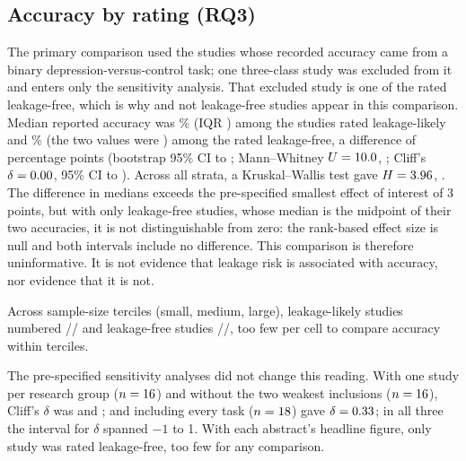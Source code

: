 \subsection{Accuracy by rating (RQ3)}
The primary comparison used the \NaccStudies{} studies whose recorded accuracy came from a binary depression-versus-control task; one three-class study was excluded from it and enters only the sensitivity analysis.
That excluded study is one of the \NFree{} rated leakage-free, which is why \NaccFree{} and not \NFree{} leakage-free studies appear in this comparison. Median reported accuracy was \MedLikely\% (IQR \IQRLikely) among the \NaccLikely{} studies rated leakage-likely and \MedFree\% (the two values were \AccFreeValues) among the \NaccFree{} rated leakage-free, a difference of \MedDiff{} percentage points (bootstrap 95\% CI \MedDiffLo{} to \MedDiffHi; Mann--Whitney $U = 10.0$, \MWp; Cliff's $\delta = 0.00$, 95\% CI \CliffLo{} to \CliffHi). Across all \KWk{} strata, a Kruskal--Wallis test gave $H = 3.96$, \KWp.
The difference in medians exceeds the pre-specified smallest effect of interest of 3 points, but with only \NaccFree{} leakage-free studies, whose median is the midpoint of their two accuracies, it is not distinguishable from zero: the rank-based effect size is null and both intervals include no difference. This comparison is therefore uninformative. It is not evidence that leakage risk is associated with accuracy, nor evidence that it is not.

Across sample-size terciles (small, medium, large), leakage-likely studies numbered \NLikelySmall/\NLikelyMedium/\NLikelyLarge{} and leakage-free studies \NFreeSmall/\NFreeMedium/\NFreeLarge, too few per cell to compare accuracy within terciles.

The pre-specified sensitivity analyses did not change this reading. With one study per research group ($n = 16$) and without the two weakest inclusions ($n = 16$), Cliff's $\delta$ was \SensOneDelta{} and \SensThreeDelta; and including every task ($n = 18$) gave $\delta = 0.33$; in all three the interval for $\delta$ spanned $-1$ to 1. With each abstract's headline figure, only \SensFourNfree{} study was rated leakage-free, too few for any comparison.

